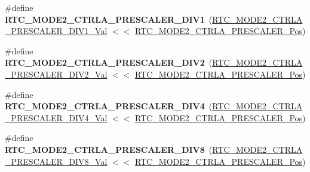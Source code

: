 \begin{DoxyCompactItemize}
\item 
\hypertarget{group___s_a_m_l21___r_t_c_gaa3e03071e100dbd074b8ec5ef8677af0}{}\#define {\bfseries R\+T\+C\+\_\+\+M\+O\+D\+E2\+\_\+\+C\+T\+R\+L\+A\+\_\+\+P\+R\+E\+S\+C\+A\+L\+E\+R\+\_\+\+D\+I\+V1}~(\hyperlink{group___s_a_m_l21___r_t_c_ga61f302dee0e5a4258d8d4eb81b12d31c}{R\+T\+C\+\_\+\+M\+O\+D\+E2\+\_\+\+C\+T\+R\+L\+A\+\_\+\+P\+R\+E\+S\+C\+A\+L\+E\+R\+\_\+\+D\+I\+V1\+\_\+\+Val} $<$$<$ \hyperlink{group___s_a_m_l21___r_t_c_ga8ceb43a4478f656d6288fabd99a094fb}{R\+T\+C\+\_\+\+M\+O\+D\+E2\+\_\+\+C\+T\+R\+L\+A\+\_\+\+P\+R\+E\+S\+C\+A\+L\+E\+R\+\_\+\+Pos})\label{group___s_a_m_l21___r_t_c_gaa3e03071e100dbd074b8ec5ef8677af0}

\item 
\hypertarget{group___s_a_m_l21___r_t_c_gac1e2bcfb20d3f455787bff899949bd98}{}\#define {\bfseries R\+T\+C\+\_\+\+M\+O\+D\+E2\+\_\+\+C\+T\+R\+L\+A\+\_\+\+P\+R\+E\+S\+C\+A\+L\+E\+R\+\_\+\+D\+I\+V2}~(\hyperlink{group___s_a_m_l21___r_t_c_ga9d3141c6fa717c767ad9a06b5e72ec0d}{R\+T\+C\+\_\+\+M\+O\+D\+E2\+\_\+\+C\+T\+R\+L\+A\+\_\+\+P\+R\+E\+S\+C\+A\+L\+E\+R\+\_\+\+D\+I\+V2\+\_\+\+Val} $<$$<$ \hyperlink{group___s_a_m_l21___r_t_c_ga8ceb43a4478f656d6288fabd99a094fb}{R\+T\+C\+\_\+\+M\+O\+D\+E2\+\_\+\+C\+T\+R\+L\+A\+\_\+\+P\+R\+E\+S\+C\+A\+L\+E\+R\+\_\+\+Pos})\label{group___s_a_m_l21___r_t_c_gac1e2bcfb20d3f455787bff899949bd98}

\item 
\hypertarget{group___s_a_m_l21___r_t_c_gaaa543513e335516a78e961a9c6d7420a}{}\#define {\bfseries R\+T\+C\+\_\+\+M\+O\+D\+E2\+\_\+\+C\+T\+R\+L\+A\+\_\+\+P\+R\+E\+S\+C\+A\+L\+E\+R\+\_\+\+D\+I\+V4}~(\hyperlink{group___s_a_m_l21___r_t_c_ga1b5e55629b6e73a12af4cbb3ee7ad94c}{R\+T\+C\+\_\+\+M\+O\+D\+E2\+\_\+\+C\+T\+R\+L\+A\+\_\+\+P\+R\+E\+S\+C\+A\+L\+E\+R\+\_\+\+D\+I\+V4\+\_\+\+Val} $<$$<$ \hyperlink{group___s_a_m_l21___r_t_c_ga8ceb43a4478f656d6288fabd99a094fb}{R\+T\+C\+\_\+\+M\+O\+D\+E2\+\_\+\+C\+T\+R\+L\+A\+\_\+\+P\+R\+E\+S\+C\+A\+L\+E\+R\+\_\+\+Pos})\label{group___s_a_m_l21___r_t_c_gaaa543513e335516a78e961a9c6d7420a}

\item 
\hypertarget{group___s_a_m_l21___r_t_c_gab3408c0d9a0a62bd0c82264792393e59}{}\#define {\bfseries R\+T\+C\+\_\+\+M\+O\+D\+E2\+\_\+\+C\+T\+R\+L\+A\+\_\+\+P\+R\+E\+S\+C\+A\+L\+E\+R\+\_\+\+D\+I\+V8}~(\hyperlink{group___s_a_m_l21___r_t_c_ga495698ab5aa1a8e8e2686e1b23deb4ed}{R\+T\+C\+\_\+\+M\+O\+D\+E2\+\_\+\+C\+T\+R\+L\+A\+\_\+\+P\+R\+E\+S\+C\+A\+L\+E\+R\+\_\+\+D\+I\+V8\+\_\+\+Val} $<$$<$ \hyperlink{group___s_a_m_l21___r_t_c_ga8ceb43a4478f656d6288fabd99a094fb}{R\+T\+C\+\_\+\+M\+O\+D\+E2\+\_\+\+C\+T\+R\+L\+A\+\_\+\+P\+R\+E\+S\+C\+A\+L\+E\+R\+\_\+\+Pos})\label{group___s_a_m_l21___r_t_c_gab3408c0d9a0a62bd0c82264792393e59}


\end{DoxyCompactItemize}
